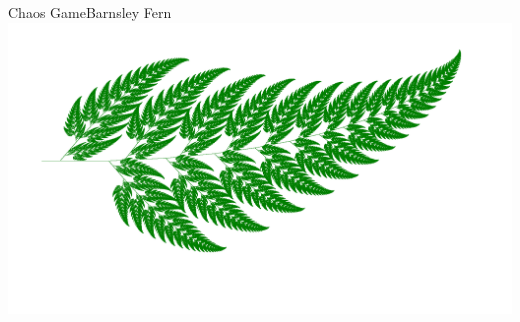 \documentclass[usenames,dvipsnames,svgnames,10pt,aspectratio=169]{beamer}
\begin{document}
\begin{frame}[t, c]{Chaos Game}{Barnsley Fern}
	\centering
	\includegraphics[width=.8\textwidth]{Barnsley_fern_6}
	\vspace{1cm}
\end{frame}
\end{document}
